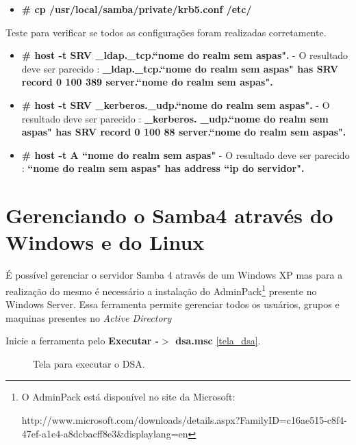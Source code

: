 \begin{itemize}
	\item \textbf{\# cp /usr/local/samba/private/krb5.conf  /etc/}
\end{itemize}

Teste para verificar se todos as configurações foram realizadas corretamente.

\begin{itemize}
	\item \textbf{\# host -t SRV \_ldap.\_tcp.``nome do realm sem aspas".} - O resultado deve ser parecido : \textbf{\_ldap.\_tcp.``nome do realm sem aspas" has SRV record 0 100 389 server.``nome do realm sem aspas".}
	\item \textbf{\# host -t SRV \_kerberos.\_udp.``nome do realm sem aspas".} - O resultado deve ser parecido : \textbf{\_kerberos. \_udp.``nome do realm sem aspas" has SRV record 0 100 88 server.``nome do realm sem aspas".}
	\item \textbf{\# host -t A ``nome do realm sem aspas"} - O resultado deve ser parecido : \textbf{``nome do realm sem aspas" has address ``ip do servidor".} 
\end{itemize}

\section{Gerenciando o Samba4 através do Windows e do Linux}

É possível gerenciar o servidor Samba 4 através de um Windows XP mas para a realização do mesmo é necessário a instalação do AdminPack\footnote[4]{O AdminPack está disponível no site da Microsoft:

http://www.microsoft.com/downloads/details.aspx?FamilyID=c16ae515-c8f4-47ef-a1e4-a8dcbacff8e3\&displaylang=en} presente no Windows Server. Essa ferramenta permite gerenciar todos os usuários, grupos e maquinas presentes no \textit{Active Directory}

Inicie a ferramenta pelo \textbf{Executar -$>$ dsa.msc} \ref{tela_dsa}.

\begin{figure}[ht]
   	\centering
   	\caption{Tela para executar o DSA.}
    \label{dsa}
\end{figure}
 
